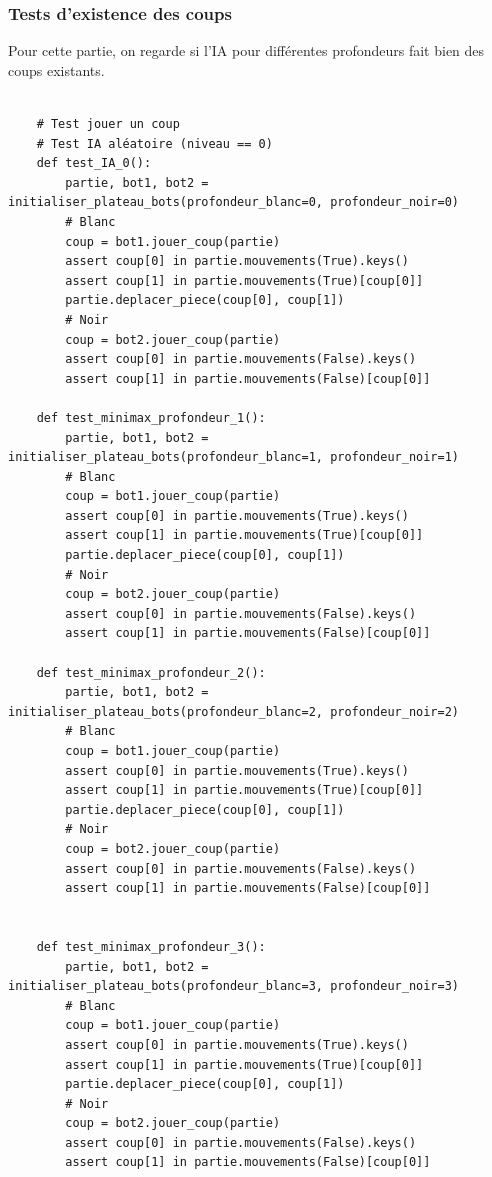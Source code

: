 \documentclass{article}
\begin{document}
\subsubsection{Tests d'existence des coups}
Pour cette partie, on regarde si l'IA pour différentes profondeurs fait bien des coups existants.

\begin{verbatim}

    # Test jouer un coup
    # Test IA aléatoire (niveau == 0)
    def test_IA_0():
        partie, bot1, bot2 = initialiser_plateau_bots(profondeur_blanc=0, profondeur_noir=0)
        # Blanc
        coup = bot1.jouer_coup(partie)
        assert coup[0] in partie.mouvements(True).keys()
        assert coup[1] in partie.mouvements(True)[coup[0]]
        partie.deplacer_piece(coup[0], coup[1])
        # Noir
        coup = bot2.jouer_coup(partie)
        assert coup[0] in partie.mouvements(False).keys()
        assert coup[1] in partie.mouvements(False)[coup[0]]
    
    def test_minimax_profondeur_1():
        partie, bot1, bot2 = initialiser_plateau_bots(profondeur_blanc=1, profondeur_noir=1)
        # Blanc
        coup = bot1.jouer_coup(partie)
        assert coup[0] in partie.mouvements(True).keys()
        assert coup[1] in partie.mouvements(True)[coup[0]]
        partie.deplacer_piece(coup[0], coup[1])
        # Noir
        coup = bot2.jouer_coup(partie)
        assert coup[0] in partie.mouvements(False).keys()
        assert coup[1] in partie.mouvements(False)[coup[0]]
    
    def test_minimax_profondeur_2():
        partie, bot1, bot2 = initialiser_plateau_bots(profondeur_blanc=2, profondeur_noir=2)
        # Blanc
        coup = bot1.jouer_coup(partie)
        assert coup[0] in partie.mouvements(True).keys()
        assert coup[1] in partie.mouvements(True)[coup[0]]
        partie.deplacer_piece(coup[0], coup[1])
        # Noir
        coup = bot2.jouer_coup(partie)
        assert coup[0] in partie.mouvements(False).keys()
        assert coup[1] in partie.mouvements(False)[coup[0]]
        
        
    def test_minimax_profondeur_3():
        partie, bot1, bot2 = initialiser_plateau_bots(profondeur_blanc=3, profondeur_noir=3)
        # Blanc
        coup = bot1.jouer_coup(partie)
        assert coup[0] in partie.mouvements(True).keys()
        assert coup[1] in partie.mouvements(True)[coup[0]]
        partie.deplacer_piece(coup[0], coup[1])
        # Noir
        coup = bot2.jouer_coup(partie)
        assert coup[0] in partie.mouvements(False).keys()
        assert coup[1] in partie.mouvements(False)[coup[0]]
        

\end{verbatim}
\end{document}
